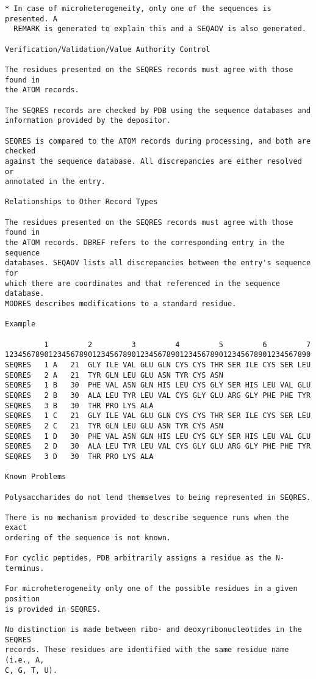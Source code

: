 \begin{lstlisting}
* In case of microheterogeneity, only one of the sequences is presented. A
  REMARK is generated to explain this and a SEQADV is also generated. 

Verification/Validation/Value Authority Control 

The residues presented on the SEQRES records must agree with those found in
the ATOM records. 

The SEQRES records are checked by PDB using the sequence databases and
information provided by the depositor. 

SEQRES is compared to the ATOM records during processing, and both are checked
against the sequence database. All discrepancies are either resolved or
annotated in the entry. 

Relationships to Other Record Types 

The residues presented on the SEQRES records must agree with those found in
the ATOM records. DBREF refers to the corresponding entry in the sequence
databases. SEQADV lists all discrepancies between the entry's sequence for
which there are coordinates and that referenced in the sequence database.
MODRES describes modifications to a standard residue. 

Example 

         1         2         3         4         5         6         7
1234567890123456789012345678901234567890123456789012345678901234567890
SEQRES   1 A   21  GLY ILE VAL GLU GLN CYS CYS THR SER ILE CYS SER LEU
SEQRES   2 A   21  TYR GLN LEU GLU ASN TYR CYS ASN                    
SEQRES   1 B   30  PHE VAL ASN GLN HIS LEU CYS GLY SER HIS LEU VAL GLU
SEQRES   2 B   30  ALA LEU TYR LEU VAL CYS GLY GLU ARG GLY PHE PHE TYR
SEQRES   3 B   30  THR PRO LYS ALA                                    
SEQRES   1 C   21  GLY ILE VAL GLU GLN CYS CYS THR SER ILE CYS SER LEU
SEQRES   2 C   21  TYR GLN LEU GLU ASN TYR CYS ASN                    
SEQRES   1 D   30  PHE VAL ASN GLN HIS LEU CYS GLY SER HIS LEU VAL GLU
SEQRES   2 D   30  ALA LEU TYR LEU VAL CYS GLY GLU ARG GLY PHE PHE TYR
SEQRES   3 D   30  THR PRO LYS ALA                                    

Known Problems 

Polysaccharides do not lend themselves to being represented in SEQRES. 

There is no mechanism provided to describe sequence runs when the exact
ordering of the sequence is not known. 

For cyclic peptides, PDB arbitrarily assigns a residue as the N-terminus. 

For microheterogeneity only one of the possible residues in a given position
is provided in SEQRES. 

No distinction is made between ribo- and deoxyribonucleotides in the SEQRES
records. These residues are identified with the same residue name (i.e., A,
C, G, T, U). 
\end{lstlisting}

